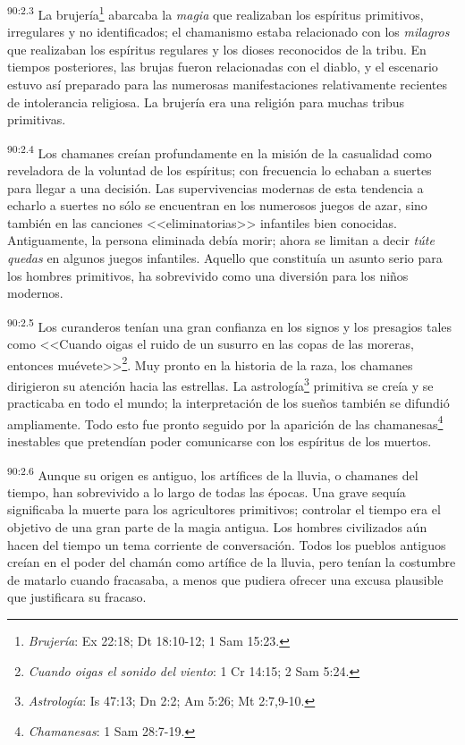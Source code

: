 \par
\textsuperscript{90:2.3} La brujería\footnote{\textit{Brujería}: Ex 22:18; Dt 18:10-12; 1 Sam 15:23.} abarcaba la \textit{magia} que realizaban los espíritus primitivos, irregulares y no identificados; el chamanismo estaba relacionado con los \textit{milagros} que realizaban los espíritus regulares y los dioses reconocidos de la tribu. En tiempos posteriores, las brujas fueron relacionadas con el diablo, y el escenario estuvo así preparado para las numerosas manifestaciones relativamente recientes de intolerancia religiosa. La brujería era una religión para muchas tribus primitivas.

\par
\textsuperscript{90:2.4} Los chamanes creían profundamente en la misión de la casualidad como reveladora de la voluntad de los espíritus; con frecuencia lo echaban a suertes para llegar a una decisión. Las supervivencias modernas de esta tendencia a echarlo a suertes no sólo se encuentran en los numerosos juegos de azar, sino también en las canciones <<eliminatorias>> infantiles bien conocidas. Antiguamente, la persona eliminada debía morir; ahora se limitan a decir \textit{túte quedas} en algunos juegos infantiles. Aquello que constituía un asunto serio para los hombres primitivos, ha sobrevivido como una diversión para los niños modernos.

\par
\textsuperscript{90:2.5} Los curanderos tenían una gran confianza en los signos y los presagios tales como <<Cuando oigas el ruido de un susurro en las copas de las moreras, entonces muévete>>\footnote{\textit{Cuando oigas el sonido del viento}: 1 Cr 14:15; 2 Sam 5:24.}. Muy pronto en la historia de la raza, los chamanes dirigieron su atención hacia las estrellas. La astrología\footnote{\textit{Astrología}: Is 47:13; Dn 2:2; Am 5:26; Mt 2:7,9-10.} primitiva se creía y se practicaba en todo el mundo; la interpretación de los sueños también se difundió ampliamente. Todo esto fue pronto seguido por la aparición de las chamanesas\footnote{\textit{Chamanesas}: 1 Sam 28:7-19.} inestables que pretendían poder comunicarse con los espíritus de los muertos.

\par
\textsuperscript{90:2.6} Aunque su origen es antiguo, los artífices de la lluvia, o chamanes del tiempo, han sobrevivido a lo largo de todas las épocas. Una grave sequía significaba la muerte para los agricultores primitivos; controlar el tiempo era el objetivo de una gran parte de la magia antigua. Los hombres civilizados aún hacen del tiempo un tema corriente de conversación. Todos los pueblos antiguos creían en el poder del chamán como artífice de la lluvia, pero tenían la costumbre de matarlo cuando fracasaba, a menos que pudiera ofrecer una excusa plausible que justificara su fracaso.

